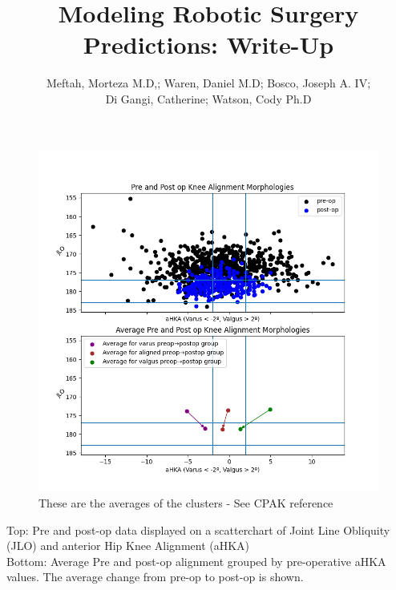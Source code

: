 \documentclass{article}
\author{Meftah, Morteza M.D,; Waren, Daniel M.D; Bosco, Joseph A. IV;\\
Di Gangi, Catherine; Watson, Cody Ph.D}
\title{Modeling Robotic Surgery Predictions: Write-Up}
\begin{document}
\maketitle

\begin{figure}[t]
\includegraphics[width=.9\textwidth]{data_vis.png}
\caption{These are the averages of the clusters - See CPAK reference}
\end{figure}

Top: Pre and post-op data displayed on a scatterchart of Joint Line Obliquity (JLO) and anterior Hip Knee Alignment (aHKA)\\
Bottom: Average Pre and post-op alignment grouped by pre-operative aHKA values.
The average change from pre-op to post-op is shown.

\newpage
\end{document}
